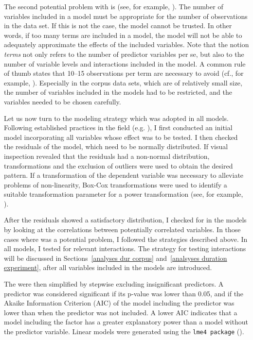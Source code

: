 The second potential problem with  is  (see, for example, \citealt{Draper.1998,Babyak.2004}). The number of variables included in a model must be appropriate for the number of observations in the data set. If this is not the case, the model cannot be trusted. In other words, if too many terms are included in a model, the model will not be able to adequately approximate the effects of the included variables. Note that the notion \textit{terms} not only refers to the number of predictor variables per se, but also to the number of variable levels and interactions included in the model.  A common rule of thumb states that 10--15 observations per term are necessary to avoid  (cf., for example, \citealt{Draper.1998}). Especially in the corpus data sets, which are of relatively small size, the number of variables included in the models had to be restricted, and the variables needed to be chosen carefully. 
 
Let us now turn to the modeling strategy which was adopted in all models. Following established practices in the field (e.g. \citealt{Baayen.2008}), I first conducted an initial model incorporating all variables whose effect was to be tested. I then checked the residuals of the model, which need to be normally distributed. If visual inspection revealed that the residuals had a non-normal distribution, transformations  and the exclusion of outliers were used to obtain the desired pattern. If a transformation of the dependent variable was necessary to alleviate problems of non-linearity, Box-Cox transformations were used to identify a suitable transformation parameter for a power transformation (see, for example, \citealt{Box.1964, Venables.2011}).

After the residuals showed a satisfactory distribution, I checked for  in the models by looking at the correlations between potentially correlated variables. In those cases where  was a potential problem, I followed the strategies described above.  In all models, I tested for relevant interactions. The strategy for testing interactions will be discussed in Sections~\ref{analyses dur corpus} and~\ref{analsyses duration experiment}, after all variables included in the models are introduced.

The  were then simplified by stepwise excluding insignificant predictors. A predictor was considered significant if its p-value was lower than 0.05, and if the Akaike Information Criterion (AIC) of the model including the predictor was lower than when the predictor was not included. A lower AIC indicates that a model including the factor has a greater explanatory power than a model without the predictor variable. Linear models were generated using the \texttt{lme4 package} (\citealt{Bates.2014}).

